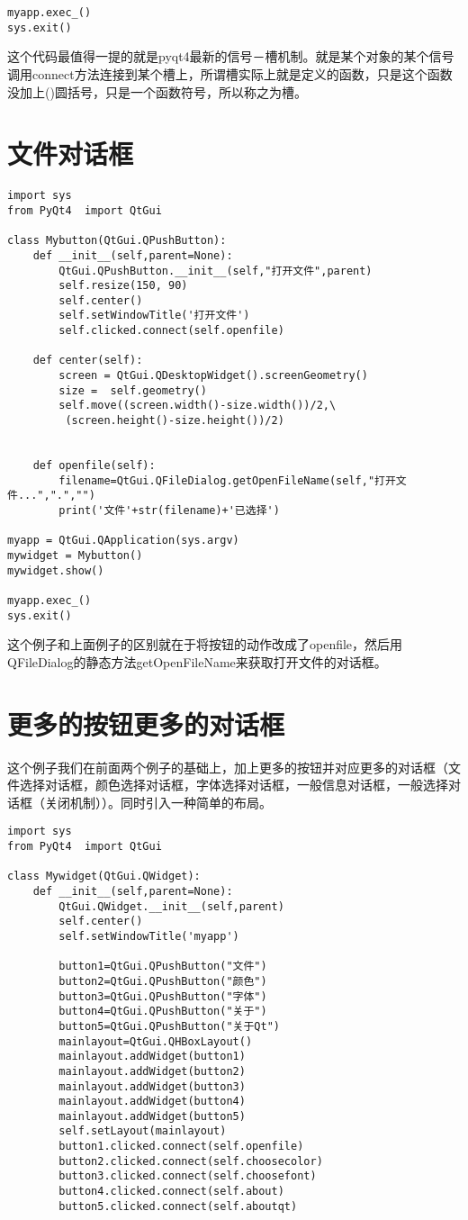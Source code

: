 \documentclass[12pt,oneside]{book}
\begin{document}
\begin{common-format}
\begin{Verbatim}
myapp.exec_()
sys.exit()
\end{Verbatim}
这个代码最值得一提的就是pyqt4最新的信号－槽机制。就是某个对象的某个信号调用connect方法连接到某个槽上，所谓槽实际上就是定义的函数，只是这个函数没加上()圆括号，只是一个函数符号，所以称之为槽。


\section{文件对话框}
\begin{Verbatim}
import sys
from PyQt4  import QtGui

class Mybutton(QtGui.QPushButton):
    def __init__(self,parent=None):
        QtGui.QPushButton.__init__(self,"打开文件",parent)
        self.resize(150, 90)
        self.center()
        self.setWindowTitle('打开文件')
        self.clicked.connect(self.openfile)

    def center(self):
        screen = QtGui.QDesktopWidget().screenGeometry()
        size =  self.geometry()
        self.move((screen.width()-size.width())/2,\
         (screen.height()-size.height())/2)


    def openfile(self):
        filename=QtGui.QFileDialog.getOpenFileName(self,"打开文件...",".","")
        print('文件'+str(filename)+'已选择')

myapp = QtGui.QApplication(sys.argv)
mywidget = Mybutton()
mywidget.show()

myapp.exec_()
sys.exit()
\end{Verbatim}
这个例子和上面例子的区别就在于将按钮的动作改成了openfile，然后用QFileDialog的静态方法getOpenFileName来获取打开文件的对话框。


\section{更多的按钮更多的对话框}
这个例子我们在前面两个例子的基础上，加上更多的按钮并对应更多的对话框（文件选择对话框，颜色选择对话框，字体选择对话框，一般信息对话框，一般选择对话框（关闭机制））。同时引入一种简单的布局。

\begin{Verbatim}
import sys
from PyQt4  import QtGui

class Mywidget(QtGui.QWidget):
    def __init__(self,parent=None):
        QtGui.QWidget.__init__(self,parent)
        self.center()
        self.setWindowTitle('myapp')

        button1=QtGui.QPushButton("文件")
        button2=QtGui.QPushButton("颜色")
        button3=QtGui.QPushButton("字体")
        button4=QtGui.QPushButton("关于")
        button5=QtGui.QPushButton("关于Qt")
        mainlayout=QtGui.QHBoxLayout()
        mainlayout.addWidget(button1)
        mainlayout.addWidget(button2)
        mainlayout.addWidget(button3)
        mainlayout.addWidget(button4)
        mainlayout.addWidget(button5)
        self.setLayout(mainlayout)
        button1.clicked.connect(self.openfile)
        button2.clicked.connect(self.choosecolor)
        button3.clicked.connect(self.choosefont)
        button4.clicked.connect(self.about)
        button5.clicked.connect(self.aboutqt)


\end{Verbatim}
\end{common-format}
\end{document}
